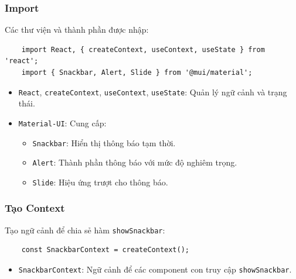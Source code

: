             \subsubsection{Import}
                \hspace*{0.6cm}Các thư viện và thành phần được nhập:
                \begin{lstlisting}
    import React, { createContext, useContext, useState } from 'react';
    import { Snackbar, Alert, Slide } from '@mui/material';
                \end{lstlisting}
                \begin{itemize}
                    \item \texttt{React}, \texttt{createContext}, \texttt{useContext}, \texttt{useState}: Quản lý ngữ cảnh và trạng thái.
                    \item \texttt{Material-UI}: Cung cấp:
                    \begin{itemize}
                        \item \texttt{Snackbar}: Hiển thị thông báo tạm thời.
                        \item \texttt{Alert}: Thành phần thông báo với mức độ nghiêm trọng.
                        \item \texttt{Slide}: Hiệu ứng trượt cho thông báo.
                    \end{itemize}
                \end{itemize}

            \subsubsection{Tạo Context}
                \hspace*{0.6cm}Tạo ngữ cảnh để chia sẻ hàm \texttt{showSnackbar}:
                \begin{lstlisting}
    const SnackbarContext = createContext();
                \end{lstlisting}
                \begin{itemize}
                    \item \texttt{SnackbarContext}: Ngữ cảnh để các component con truy cập \texttt{showSnackbar}.
                \end{itemize}

